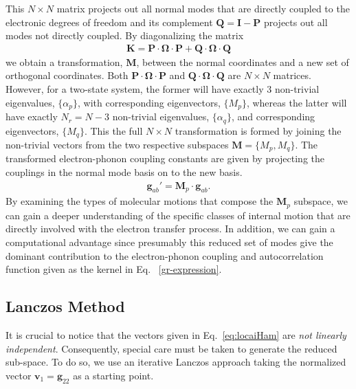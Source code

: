 This $N\times N$ matrix projects out all normal modes that are directly coupled to the
electronic degrees of freedom and
 its complement $\mathbf{Q}=\mathbf{I}-\mathbf{P}$ projects out all modes not directly coupled.
By diagonalizing the matrix
\begin{eqnarray}
\mathbf{K}=\mathbf{P}\cdot\mathbf\Omega\cdot \mathbf{P}+\mathbf{Q}\cdot\mathbf\Omega\cdot\mathbf{Q}
\end{eqnarray}
we obtain a  transformation, ${\mathbf M}$,  between the normal coordinates and a new set of orthogonal
coordinates.  Both $\mathbf{P}\cdot\mathbf\Omega\cdot \mathbf{P}$ and $\mathbf{Q}\cdot\mathbf\Omega\cdot\mathbf{Q}$ are $N\times N$ matrices.
However, for a two-state system, the former will have exactly $3$ non-trivial eigenvalues, $\{\alpha_{p}\}$, with corresponding
eigenvectors, $\{ M_{p}\}$, whereas the latter will have exactly $N_{r} = N-3$ non-trivial eigenvalues, $\{\alpha_{q}\}$,  and corresponding
eigenvectors, $\{M_q\}$.   This the full $N\times N$ transformation is formed by joining the non-trivial vectors from the
two respective subspaces ${\mathbf M} = \{M_{p}, M_{q}\}$.
The transformed electron-phonon coupling constants are given by projecting the  couplings   in the normal mode basis on to the new
basis.
\begin{eqnarray}
\mathbf{g}_{ab}'=\mathbf{M}_{p}\cdot\mathbf{g}_{ab}.
\end{eqnarray}
By examining the types of molecular motions that compose the ${\mathbf M_{p}}$ subspace, we can
gain a deeper understanding of the specific classes of internal motion that are directly involved with the
electron transfer process.  In addition,  we can gain a computational advantage since presumably this
 reduced set of modes give the dominant contribution to the electron-phonon coupling and  autocorrelation
 function given as the kernel in Eq. ~\ref{gr-expression}.

\subsection{Lanczos Method}
It is crucial to notice that the vectors  given in Eq.~\ref{eq:locaiHam} are {\em not linearly independent}.
 Consequently, special care
must be taken to generate the reduced sub-space.  To do so, we use an iterative Lanczos approach
taking the normalized vector ${\mathbf v}_{1} = {\mathbf g}_{22}$ as a starting point.

